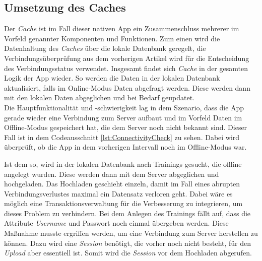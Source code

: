 \subsection{Umsetzung des Caches}
\label{ssec:nat-cache}
Der \textit{Cache} ist im Fall dieser nativen App ein Zusammenschluss mehrerer im Vorfeld genannter Komponenten und Funktionen. Zum einen wird die Datenhaltung des \textit{Caches} über die lokale Datenbank geregelt, die Verbindungsüberprüfung aus dem vorherigen Artikel wird für die Entscheidung des Verbindungsstatus verwendet. Insgesamt findet sich \textit{Cache} in der gesamten Logik der App wieder. So werden die Daten in der lokalen Datenbank aktualisiert, falls im Online-Modus Daten abgefragt werden. Diese werden dann mit den lokalen Daten abgeglichen und bei Bedarf geupdatet.\\
Die Hauptfunktionalität und -schwierigkeit lag in dem Szenario, dass die App gerade wieder eine Verbindung zum Server aufbaut und im Vorfeld Daten im Offline-Modus gespeichert hat, die dem Server noch nicht bekannt sind. Dieser Fall ist in dem Codeausschnitt \ref{lst:ConnectivityCheck} zu sehen. Dabei wird überprüft, ob die App in dem vorherigen Intervall noch im Offline-Modus war. 

Ist dem so, wird in der lokalen Datenbank nach Trainings gesucht, die offline angelegt wurden. Diese werden dann mit dem Server abgeglichen und hochgeladen. Das Hochladen geschieht einzeln, damit im Fall eines abrupten Verbindungsverlustes maximal ein Datensatz verloren geht. Dabei wäre es möglich eine Transaktionsverwaltung für die Verbesserung zu integrieren, um dieses Problem zu verhindern. Bei dem Anlegen des Trainings fällt auf, dass die Attribute \textit{Username} und Passwort noch einmal übergeben werden. Diese Maßnahme musste ergriffen werden, um eine Verbindung zum Server herstellen zu können. Dazu wird eine \textit{Session} benötigt, die vorher noch nicht besteht, für den \textit{Upload} aber essentiell ist. Somit wird die \textit{Session} vor dem Hochladen abgerufen.